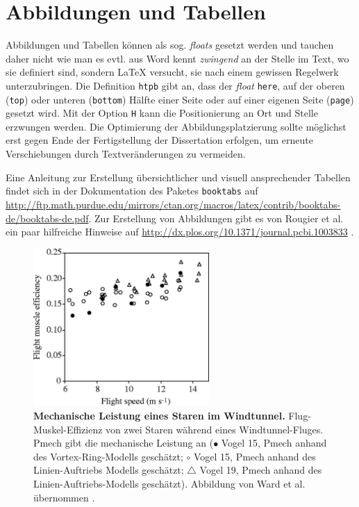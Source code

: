 \documentclass{scrreprt}
\begin{document}
\section{Abbildungen und Tabellen}

Abbildungen und Tabellen können als sog. \textit{floats} gesetzt werden und tauchen daher nicht wie man es evtl. aus Word kennt \textit{zwingend} an der Stelle im Text, wo sie definiert sind, sondern LaTeX versucht, sie nach einem gewissen Regelwerk unterzubringen. Die Definition \verb|htpb| gibt an, dass der \textit{float} \verb|here|, auf der oberen (\verb|top|) oder unteren (\verb|bottom|) Hälfte einer Seite oder auf einer eigenen Seite (\verb|page|) gesetzt wird. Mit der Option \verb|H| kann die Positionierung an Ort und Stelle erzwungen werden. Die Optimierung der Abbildungsplatzierung sollte möglichst erst gegen Ende der Fertigstellung der Dissertation erfolgen, um erneute Verschiebungen durch Textveränderungen zu vermeiden. 

Eine Anleitung zur Erstellung übersichtlicher und visuell ansprechender Tabellen findet sich in der Dokumentation des Paketes \verb|booktabs| auf \url{http://ftp.math.purdue.edu/mirrors/ctan.org/macros/latex/contrib/booktabs-de/booktabs-de.pdf}. Zur Erstellung von Abbildungen gibt es von Rougier et al. ein paar hilfreiche Hinweise auf \url{http://dx.plos.org/10.1371/journal.pcbi.1003833} \cite{Rougier2014}. 
\vspace*{0.6cm}

\begin{figure}[htpb] %
	{\centering
		\includegraphics[height=6cm]{abbildungen/Starling_Mechpower.jpg} 
		\caption[Mechanische Leistung eines Staren im Windtunnel]{
			\textbf{Mechanische Leistung eines Staren im Windtunnel.} 
			Flug-Muskel-Effizienz von zwei Staren während eines Windtunnel-Fluges. Pmech gibt die mechanische Leistung an ($\bullet$ Vogel 15, Pmech anhand des Vortex-Ring-Modells geschätzt; $\circ$ Vogel 15, Pmech anhand des Linien-Auftriebs Modells geschätzt; $\triangle$ Vogel 19, Pmech anhand des Linien-Auftriebs-Modells geschätzt). Abbildung von Ward et al. übernommen  \cite{Ward2001}.
			}
		\label{fig:beispielabbildung}
	}
\end{figure}
\end{document}
